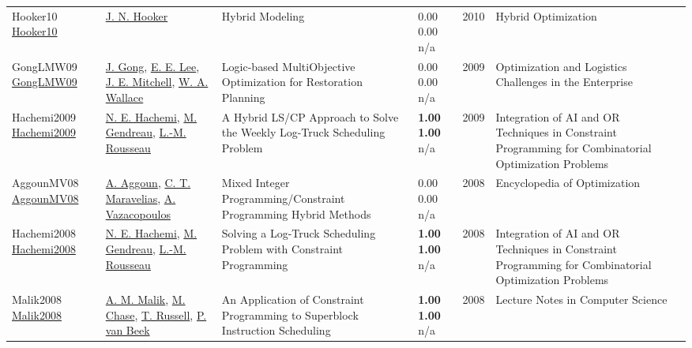 {\begin{longtable}{p{3cm}p{5cm}p{10cm}p{1cm}rp{2.5cm}l}
Hooker10 \href{http://dx.doi.org/10.1007/978-1-4419-1644-0_2}{Hooker10} & \hyperref[auth:a160]{J. N. Hooker} & Hybrid Modeling & \noindent{}\textcolor{black!50}{0.00} \textcolor{black!50}{0.00} n/a & 2010 & Hybrid Optimization & \cite{Hooker10}\\
GongLMW09 \href{http://dx.doi.org/10.1007/978-0-387-88617-6_11}{GongLMW09} & \hyperref[auth:a1233]{J. Gong}, \hyperref[auth:a1234]{E. E. Lee}, \hyperref[auth:a1235]{J. E. Mitchell}, \hyperref[auth:a1236]{W. A. Wallace} & Logic-based MultiObjective Optimization for Restoration Planning & \noindent{}\textcolor{black!50}{0.00} \textcolor{black!50}{0.00} n/a & 2009 & Optimization and Logistics Challenges in the Enterprise & \cite{GongLMW09}\\
Hachemi2009 \href{http://dx.doi.org/10.1007/978-3-642-01929-6_27}{Hachemi2009} & \hyperref[auth:a615]{N. E. Hachemi}, \hyperref[auth:a616]{M. Gendreau}, \hyperref[auth:a326]{L.-M. Rousseau} & A Hybrid LS/CP Approach to Solve the Weekly Log-Truck Scheduling Problem & \noindent{}\textbf{1.00} \textbf{1.00} n/a & 2009 & Integration of AI and OR Techniques in Constraint Programming for Combinatorial Optimization Problems & \cite{Hachemi2009}\\
AggounMV08 \href{http://dx.doi.org/10.1007/978-0-387-74759-0_396}{AggounMV08} & \hyperref[auth:a725]{A. Aggoun}, \hyperref[auth:a381]{C. T. Maravelias}, \hyperref[auth:a907]{A. Vazacopoulos} & Mixed Integer Programming/Constraint Programming Hybrid Methods & \noindent{}\textcolor{black!50}{0.00} \textcolor{black!50}{0.00} n/a & 2008 & Encyclopedia of Optimization & \cite{AggounMV08}\\
Hachemi2008 \href{http://dx.doi.org/10.1007/978-3-540-68155-7_25}{Hachemi2008} & \hyperref[auth:a615]{N. E. Hachemi}, \hyperref[auth:a616]{M. Gendreau}, \hyperref[auth:a326]{L.-M. Rousseau} & Solving a Log-Truck Scheduling Problem with Constraint Programming & \noindent{}\textbf{1.00} \textbf{1.00} n/a & 2008 & Integration of AI and OR Techniques in Constraint Programming for Combinatorial Optimization Problems & \cite{Hachemi2008}\\
Malik2008 \href{http://dx.doi.org/10.1007/978-3-540-85958-1_7}{Malik2008} & \hyperref[auth:a638]{A. M. Malik}, \hyperref[auth:a1654]{M. Chase}, \hyperref[auth:a1655]{T. Russell}, \hyperref[auth:a610]{P. van Beek} & An Application of Constraint Programming to Superblock Instruction Scheduling & \noindent{}\textbf{1.00} \textbf{1.00} n/a & 2008 & Lecture Notes in Computer Science & \cite{Malik2008}\\

\end{longtable}}
